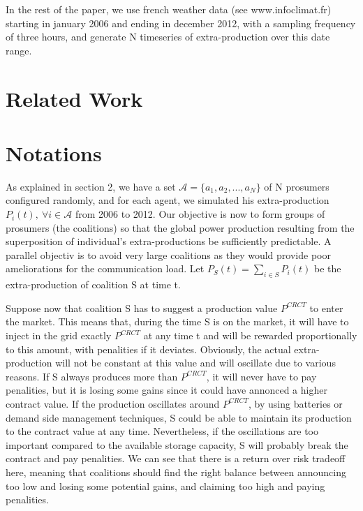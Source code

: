 \documentclass[conference]{IEEEtran}
\begin{document}
In the rest of the paper, we use french weather data (see www.infoclimat.fr) starting in january 2006 and ending in december 2012, with a sampling frequency of three hours, and generate N timeseries of extra-production over this date range.


%
%

\section{Related Work}
\label{sec:related}



%
%

\section{Notations}
\label{sec:notations}

As explained in section 2, we have a set $ \mathcal{A} = \{a_{1},a_{2},...,a_{N} \} $ of N prosumers configured randomly, and for each agent, we simulated his extra-production $ P_{i}(t),\ \forall i \in \mathcal{A} $ from 2006 to 2012. Our objective is now to form groups of prosumers (the coalitions) so that the global power production resulting from the superposition of individual's extra-productions be sufficiently predictable. A parallel objectiv is to avoid very large coalitions as they would provide poor ameliorations for the communication load. Let $ P_{S}(t) = \sum_{i \in S} P_{i}(t) $ be the extra-production of coalition S at time t. 

Suppose now that coalition S has to suggest a production value $ P^{CRCT} $ to enter the market. This means that, during the time S is on the market, it will have to inject in the grid exactly $ P^{CRCT} $ at any time t and will be rewarded proportionally to this amount, with penalities if it deviates. Obviously, the actual extra-production will not be constant at this value and will oscillate due to various reasons. If S always produces more than $ P^{CRCT} $, it will never have to pay penalities, but it is losing some gains since it could have annonced a higher contract value. If the production oscillates around $ P^{CRCT} $, by using batteries or demand side management techniques, S could be able to maintain its production to the contract value at any time. Nevertheless, if the oscillations are too important compared to the available storage capacity, S will probably break the contract and pay penalities. We can see that there is a return over risk tradeoff here, meaning that coalitions should find the right balance between announcing too low and losing some potential gains, and claiming too high and paying penalities. 
\end{document}

